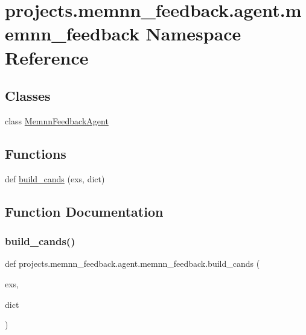 \hypertarget{namespaceprojects_1_1memnn__feedback_1_1agent_1_1memnn__feedback}{}\section{projects.\+memnn\+\_\+feedback.\+agent.\+memnn\+\_\+feedback Namespace Reference}
\label{namespaceprojects_1_1memnn__feedback_1_1agent_1_1memnn__feedback}
\subsection*{Classes}
\begin{DoxyCompactItemize}
\item 
class \hyperlink{classprojects_1_1memnn__feedback_1_1agent_1_1memnn__feedback_1_1MemnnFeedbackAgent}{Memnn\+Feedback\+Agent}
\end{DoxyCompactItemize}
\subsection*{Functions}
\begin{DoxyCompactItemize}
\item 
def \hyperlink{namespaceprojects_1_1memnn__feedback_1_1agent_1_1memnn__feedback_a098f9dace138acef711a30ce16831284}{build\+\_\+cands} (exs, dict)
\end{DoxyCompactItemize}


\subsection{Function Documentation}
\mbox{\label{namespaceprojects_1_1memnn__feedback_1_1agent_1_1memnn__feedback_a098f9dace138acef711a30ce16831284}} 
\subsubsection{\texorpdfstring{build\+\_\+cands()}{build\_cands()}}
{\footnotesize\ttfamily def projects.\+memnn\+\_\+feedback.\+agent.\+memnn\+\_\+feedback.\+build\+\_\+cands (\begin{DoxyParamCaption}\item[{}]{exs,  }\item[{}]{dict }\end{DoxyParamCaption})}

